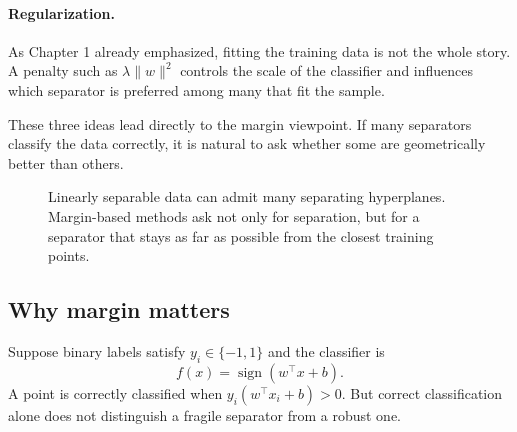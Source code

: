 \paragraph{Regularization.}
As Chapter 1 already emphasized, fitting the training data is not the whole story. A penalty such as $\lambda\|w\|^2$ controls the scale of the classifier and influences which separator is preferred among many that fit the sample.

These three ideas lead directly to the margin viewpoint. If many separators classify the data correctly, it is natural to ask whether some are geometrically better than others.

\begin{figure}[tbp]
\centering
{}
\caption{Linearly separable data can admit many separating hyperplanes. Margin-based methods ask not only for separation, but for a separator that stays as far as possible from the closest training points.}
\end{figure}

\subsection*{Why margin matters}

Suppose binary labels satisfy $y_i\in\{-1,1\}$ and the classifier is
\[
f(x)=\operatorname{sign}(w^\top x+b).
\]
A point is correctly classified when $y_i(w^\top x_i+b)>0$. But correct classification alone does not distinguish a fragile separator from a robust one.

